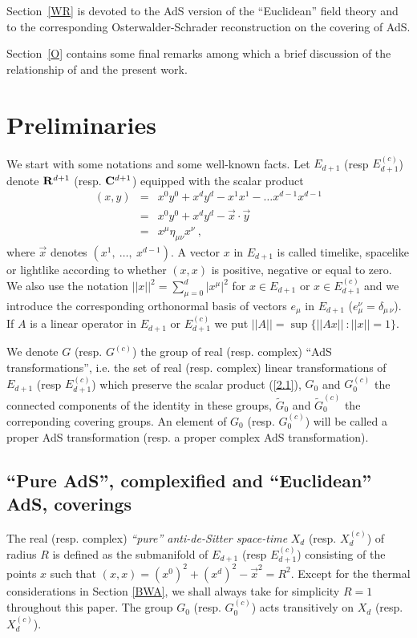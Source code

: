 \documentclass[a4paper,a4paper]{article}
\let\UnmodifSec=\section
\renewcommand{\section}{\setcounter{equation}{0}\UnmodifSec}
\def\bC{{\bf C}}
\def\bR{{\bf R}}
\def\wt{\widetilde}
\def\amb{E_{d+1}}
\begin{document}
Section~\ref{WR} is devoted to the AdS version of
the ``Euclidean'' field theory and to the
corresponding Osterwalder-Schrader reconstruction on the
covering of AdS.

Section~\ref{O} contains some final remarks among which a
brief discussion of the relationship of \cite{BFS} and the present work.



\section{Preliminaries}

\label{PRE}
We start with some notations and some well-known facts.
Let $\amb$ (resp $\amb^{(c)}$) denote $\bR^{d+1}$
(resp. $\bC^{d+1}$) equipped with the scalar product
\begin{eqnarray}
(x,y) &=& x^0 y^0 + x^d y^d - x^1 x^1 - \dots x^{d-1} x^{d-1} \nonumber\\
&=& x^0 y^0 + x^d y^d - \vec{x}\cdot \vec{y}\nonumber\\
&=& x^\mu\eta_{\mu\nu}x^\nu\ ,
\label{2.1}\end{eqnarray}
where $\vec{x}$ denotes $(x^1,\ \dots,\ x^{d-1})$.
A vector
$x$ in $\amb$ is called timelike, spacelike or lightlike
according to whether $(x,x)$ is positive,
negative or equal to zero.
We also use the notation
$||x||^2 = \sum_{\mu = 0}^d |x^\mu|^2$ for $x \in \amb$ or
$x \in \amb^{(c)}$
and we introduce the corresponding orthonormal basis
of vectors $e_\mu$ in $\amb$
($e_\mu^{\nu} = \delta_{\mu\,\nu}$).
If $A$ is a linear operator in
$\amb$ or $\amb^{(c)}$ we put
$||A|| = \sup \{||Ax||\ : ||x|| = 1\}$.

We denote $G$ (resp. $G^{(c)}$) the group of real (resp. complex) ``AdS
transformations'', i.e. the set of real (resp. complex) linear transformations
of $\amb$ (resp $\amb^{(c)}$) which preserve the scalar product (\ref{2.1}),
$G_0$ and $G_0^{(c)}$ the connected components of the identity in these
groups, $\wt G_0$ and $\wt G_0^{(c)}$ the correponding covering groups. An
element of $G_0$ (resp. $G_0^{(c)}$) will be called a proper AdS
transformation (resp. a proper complex AdS transformation).

\subsection{``Pure AdS'', complexified and ``Euclidean'' AdS,
coverings}
\label{pureetc}


\vskip 0.2cm
The real (resp. complex) {\sl ``pure'' anti-de-Sitter space-time} $X_d$
(resp. $X_d^{(c)}$) of radius $R$ is defined as the submanifold of
$\amb$ (resp $\amb^{(c)}$) consisting of the points $x$
such that $(x,x)= (x^0)^2 + (x^d)^2 - {\vec x}^2 =R^2$.
Except for the thermal considerations in Section
\ref{BWA}, we shall always take for simplicity $R=1$ throughout
this paper.
The group $G_0$ (resp. $G_0^{(c)}$) acts
transitively on $X_d$ (resp. $X_d^{(c)}$).
\end{document}
